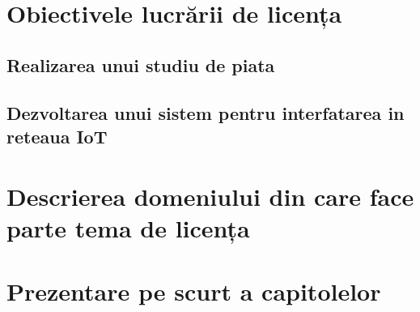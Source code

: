 \section {Obiectivele lucrării de licența}

\subsection {Realizarea unui studiu de piata}

\subsection {Dezvoltarea unui sistem pentru interfatarea in reteaua IoT}

\section {Descrierea domeniului din care face parte tema de licența}

\section {Prezentare pe scurt a capitolelor}

